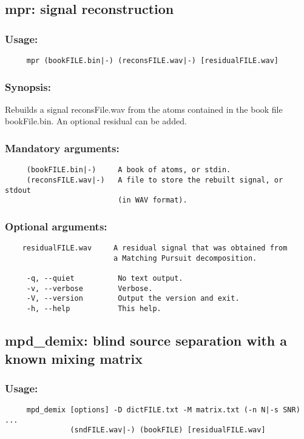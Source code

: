\documentclass[11pt,a4paper]{article}
\begin{document}
\clearpage
\subsection{mpr: signal reconstruction}

\subsubsection*{Usage:}
\begin{verbatim}
     mpr (bookFILE.bin|-) (reconsFILE.wav|-) [residualFILE.wav]
\end{verbatim}

\subsubsection*{Synopsis:}
Rebuilds a signal reconsFile.wav from the atoms contained in the book file
bookFile.bin.  An optional residual can be added.

\subsubsection*{Mandatory arguments:}
\begin{verbatim}
     (bookFILE.bin|-)     A book of atoms, or stdin.
     (reconsFILE.wav|-)   A file to store the rebuilt signal, or stdout
                          (in WAV format).
\end{verbatim}

\subsubsection*{Optional arguments:}
\begin{verbatim}
    residualFILE.wav     A residual signal that was obtained from
                         a Matching Pursuit decomposition.

     -q, --quiet          No text output.
     -v, --verbose        Verbose.
     -V, --version        Output the version and exit.
     -h, --help           This help.
\end{verbatim}


\clearpage
\subsection{mpd\_demix: blind source separation with a known mixing matrix}

\subsubsection*{Usage:}
\begin{verbatim}
     mpd_demix [options] -D dictFILE.txt -M matrix.txt (-n N|-s SNR) ...
               (sndFILE.wav|-) (bookFILE) [residualFILE.wav]
\end{verbatim}
\end{document}
